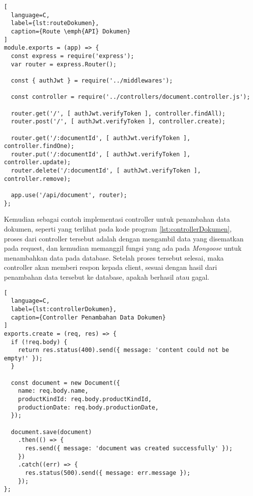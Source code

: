 \newpage

\begin{lstlisting}[
  language=C,
  label={lst:routeDokumen},
  caption={Route \emph{API} Dokumen}
]
module.exports = (app) => {
  const express = require('express');
  var router = express.Router();

  const { authJwt } = require('../middlewares');

  const controller = require('../controllers/document.controller.js');

  router.get('/', [ authJwt.verifyToken ], controller.findAll);
  router.post('/', [ authJwt.verifyToken ], controller.create);

  router.get('/:documentId', [ authJwt.verifyToken ], controller.findOne);
  router.put('/:documentId', [ authJwt.verifyToken ], controller.update);
  router.delete('/:documentId', [ authJwt.verifyToken ], controller.remove);

  app.use('/api/document', router);
};
\end{lstlisting}
\vspace{0.5ex}

Kemudian sebagai contoh implementasi controller untuk penambahan data dokumen, seperti yang terlihat pada kode program \ref{lst:controllerDokumen}, proses dari controller tersebut adalah dengan mengambil data yang disematkan pada request, dan kemudian memanggil fungsi yang ada pada \emph{Mongoose} untuk menambahkan data pada database.
Setelah proses tersebut selesai, maka controller akan memberi respon kepada client, sesuai dengan hasil dari penambahan data tersebut ke database, apakah berhasil atau gagal.
\vspace{0.5ex}

\begin{lstlisting}[
  language=C,
  label={lst:controllerDokumen},
  caption={Controller Penambahan Data Dokumen}
]
exports.create = (req, res) => {
  if (!req.body) {
    return res.status(400).send({ message: 'content could not be empty!' });
  }

  const document = new Document({
    name: req.body.name,
    productKindId: req.body.productKindId,
    productionDate: req.body.productionDate,
  });

  document.save(document)
    .then(() => {
      res.send({ message: 'document was created successfully' });
    })
    .catch((err) => {
      res.status(500).send({ message: err.message });
    });
};
\end{lstlisting}
\vspace{0.5ex}

